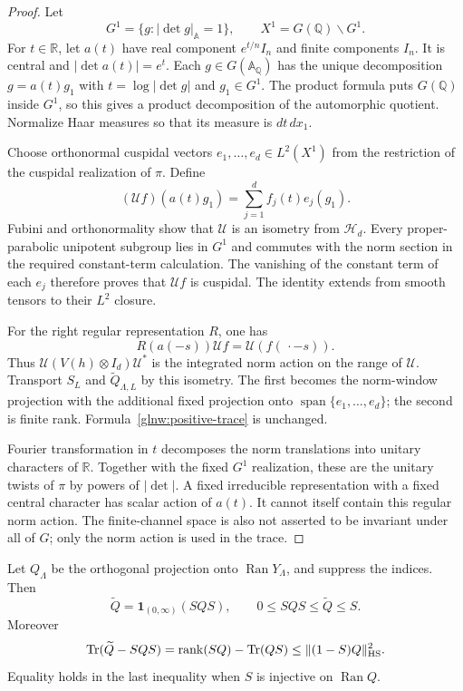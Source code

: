 \begin{proof}
Let
\[
 G^1=\{g:|\det g|_{\mathbb A}=1\},\qquad
 X^1=G(\mathbb Q)\backslash G^1 .
\]
For $t\in\mathbb R$, let $a(t)$ have real component
$e^{t/n}I_n$ and finite components $I_n$. It is central and
$|\det a(t)|=e^t$. Each $g\in G(\mathbb A_\mathbb Q)$ has the unique decomposition
$g=a(t)g_1$ with $t=\log|\det g|$ and $g_1\in G^1$.
The product formula puts $G(\mathbb Q)$ inside $G^1$, so this
gives a product decomposition of the automorphic quotient.
Normalize Haar measures so that its measure is $dt\,dx_1$.

Choose orthonormal cuspidal vectors
$e_1,\ldots,e_d\in L^2(X^1)$ from the restriction of the
cuspidal realization of $\pi$. Define
\[
 (\mathcal U f)(a(t)g_1)=\sum_{j=1}^d f_j(t)e_j(g_1).
\]
Fubini and orthonormality show that $\mathcal U$ is an isometry
from $\mathcal H_d$. Every proper-parabolic unipotent subgroup
lies in $G^1$ and commutes with the norm section in the required
constant-term calculation. The vanishing of the constant term
of each $e_j$ therefore proves that $\mathcal U f$ is cuspidal.
The identity extends from smooth tensors to their $L^2$ closure.

For the right regular representation $R$, one has
\[
 R(a(-s))\mathcal U f=\mathcal U(f(\,\cdot-s)).
\]
Thus $\mathcal U(V(h)\otimes I_d)\mathcal U^*$ is the integrated
norm action on the range of $\mathcal U$. Transport
$S_L$ and $\widetilde Q_{\Lambda,L}$ by this isometry. The first
becomes the norm-window projection with the additional fixed
projection onto $\operatorname{span}\{e_1,\ldots,e_d\}$; the
second is finite rank. Formula~\eqref{glnw:positive-trace} is
unchanged.

Fourier transformation in $t$ decomposes the norm translations
into unitary characters of $\mathbb R$. Together with the
fixed $G^1$ realization, these are the unitary twists of $\pi$
by powers of $|\det|$. A fixed irreducible representation
with a fixed central character has scalar action of $a(t)$.
It cannot itself contain this regular norm action. The
finite-channel space is also not asserted to be invariant
under all of $G$; only the norm action is used in the trace.
\end{proof}

\begin{proposition}
\label{glnw:comparison}
Let $Q_\Lambda$ be the orthogonal projection onto
$\operatorname{Ran}Y_\Lambda$, and suppress the indices.
Then
\[
 \widetilde Q=\mathbf1_{(0,\infty)}(SQS),\qquad
 0\leq SQS\leq\widetilde Q\leq S .
\]
Moreover
\begin{equation}\label{glnw:normalization-loss}
 \operatorname{Tr}(\widetilde Q-SQS)
  =\operatorname{rank}(SQ)-\operatorname{Tr}(QS)
  \leq\|(1-S)Q\|_{\mathrm{HS}}^2 .
\end{equation}
Equality holds in the last inequality when $S$ is injective
on $\operatorname{Ran}Q$.
\end{proposition}

